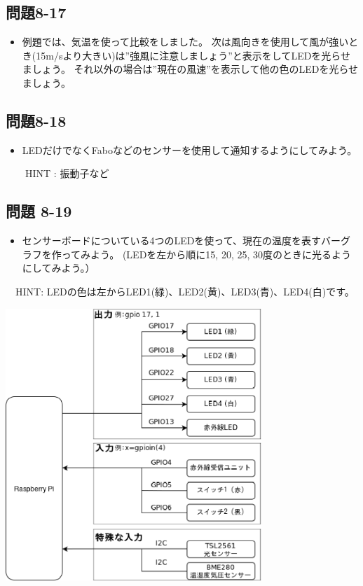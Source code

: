 \documentclass[a4paper,12pt,dvipdfmx]{jarticle}
\begin{document}
\subsection*{問題8-17}
\begin{itemize}
\item
例題では、気温を使って比較をしました。
		次は風向きを使用して風が強いとき(15m/sより大きい)は”強風に注意しましょう”と表示をしてLEDを光らせましょう。
		それ以外の場合は”現在の風速”を表示して他の色のLEDを光らせましょう。
\end{itemize}
\subsection*{問題8-18}
\begin{itemize}
\item
LEDだけでなくFaboなどのセンサーを使用して通知するようにしてみよう。
\end{itemize}
\ \ \ \ HINT : 振動子など


\bigskip


\bigskip

\subsection*{問題 8-19}
\begin{itemize}
\item
センサーボードについている4つのLEDを使って、現在の温度を表すバーグラフを作ってみよう。
		(LEDを左から順に15,
20, 25,
30度のときに光るようにしてみよう。）
\end{itemize}
\ \ HINT:
LEDの色は左からLED1(緑)、LED2(黄)、LED3(青)、LED4(白)です。

\begin{center}
\includegraphics[width=9.668cm,height=10.287cm]{textbook-img040.eps}

\end{center}
\end{document}
